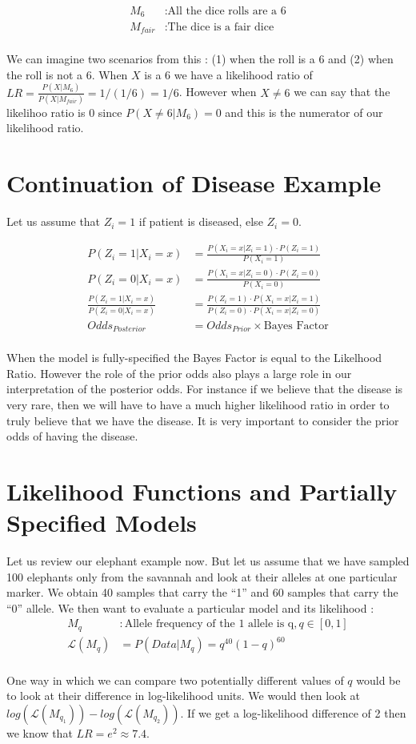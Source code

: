 \documentclass[11pt]{article}
\begin{document}
\begin{align*}
M_6 &: \text{All the dice rolls are a 6}\\
M_{fair} &: \text{The dice is a fair dice}\\
\end{align*}

We can imagine two scenarios from this : (1) when the roll is a 6 and (2) when the roll is not a 6. When $X$ is a 6 we have a likelihood ratio of $LR = \frac{P(X | M_6)}{P(X | M_{fair})} = 1/(1/6) = 1/6$. However when $X \neq 6$ we can say that the likelihoo ratio is 0 since $P(X \neq 6 | M_6) = 0$ and this is the numerator of our likelihood ratio.

\section*{Continuation of Disease Example}

Let us assume that $Z_i = 1$ if patient is diseased, else $Z_i = 0$. 

\begin{align*}
P(Z_i = 1 | X_i = x) &= \frac{P(X_i = x | Z_i = 1) \cdot P(Z_i = 1)}{P(X_i = 1)}\\
P(Z_i = 0 | X_i = x) &= \frac{P(X_i = x | Z_i = 0) \cdot P(Z_i = 0)}{P(X_i = 0)}\\
\frac{P(Z_i = 1 | X_i = x)}{P(Z_i = 0 | X_i = x)} &= \frac{P(Z_i = 1)\cdot P(X_i = x | Z_i = 1)}{ P(Z_i = 0) \cdot P(X_i = x | Z_i = 0) }\\
Odds_{Posterior} &= Odds_{Prior} \times \text{Bayes Factor}\\
\end{align*}

When the model is fully-specified the Bayes Factor is equal to the Likelhood Ratio. However the role of the prior odds also plays a large role in our interpretation of the posterior odds. For instance if we believe that the disease is very rare, then we will have to have a much higher likelihood ratio in order to truly believe that we have the disease. It is very important to consider the prior odds of having the disease. 

\section*{Likelihood Functions and Partially Specified Models}

Let us review our elephant example now. But let us assume that we have sampled 100 elephants only from the savannah and look at their alleles at one particular marker. We obtain 40 samples that carry the ``1'' and 60 samples that carry the ``0'' allele. We then want to evaluate a particular model and its likelihood : 
\begin{align*}
M_q &: \text{Allele frequency of the 1 allele is q}, q \in[0,1]\\
\mathcal{L}(M_q) &= P(Data | M_q) = q^{40}(1-q)^{60}\\
\end{align*}

One way in which we can compare two potentially different values of $q$ would be to look at their difference in log-likelihood units. We would then look at $log(\mathcal{L}(M_{q_1})) - log(\mathcal{L}(M_{q_2}))$. If we get a log-likelihood difference of 2 then we know that $LR = e^2 \approx 7.4$.  
\end{document}

